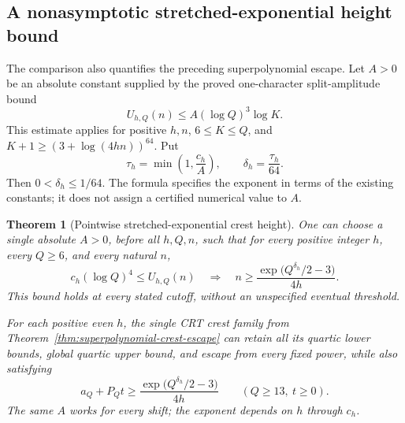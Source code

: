 \documentclass[11pt]{article}
\newtheorem{theorem}{Theorem}[section]
\begin{document}
\subsection{A nonasymptotic stretched-exponential height bound}
The comparison also quantifies the preceding superpolynomial escape.
Let \(A>0\) be an absolute constant supplied by the proved one-character
split-amplitude bound
\[
                         U_{h,Q}(n)\leq A(\log Q)^3\log K.
\]
This estimate applies for positive \(h,n\), \(6\leq K\leq Q\), and
\(K+1\geq(3+\log(4hn))^{64}\). Put
\[
 \tau_h=\min\left(1,\frac{c_h}{A}\right),
 \qquad
 \delta_h=\frac{\tau_h}{64}.
\]
Then \(0<\delta_h\leq1/64\). The formula specifies the exponent in
terms of the existing constants; it does not assign a certified
numerical value to \(A\).

\begin{theorem}[Pointwise stretched-exponential crest height]
\label{thm:stretched-exponential-crest-height}
One can choose a single absolute \(A>0\), before all \(h,Q,n\), such
that for every positive integer \(h\), every \(Q\geq6\), and every
natural \(n\),
\[
 c_h(\log Q)^4\leq U_{h,Q}(n)
 \quad\Longrightarrow\quad
 n\geq\frac{\exp\bigl(Q^{\delta_h}/2-3\bigr)}{4h}.
\]
This bound holds at every stated cutoff, without an unspecified
eventual threshold.

For each positive even \(h\), the single CRT crest family from
Theorem~\ref{thm:superpolynomial-crest-escape} can retain all its
quartic lower bounds, global quartic upper bound, and escape from
every fixed power, while also satisfying
\[
 a_Q+P_Qt\geq
       \frac{\exp\bigl(Q^{\delta_h}/2-3\bigr)}{4h}
       \qquad(Q\geq13,\ t\geq0).
\]
The same \(A\) works for every shift; the exponent depends on \(h\)
through \(c_h\).
\end{theorem}
\end{document}
